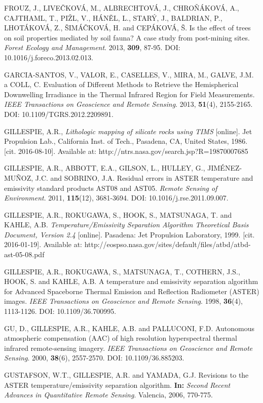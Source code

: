 \begin{thebibliography}{10}
 FROUZ, J., LIVEČKOVÁ, M., ALBRECHTOVÁ, J., CHROŇÁKOVÁ, A., CAJTHAML, T., PIŽL, V., HÁNĚL, L., STARÝ, J., BALDRIAN, P., LHOTÁKOVÁ, Z., ŠIMÁČKOVÁ, H. and CEPÁKOVÁ, Š. Is the effect of trees on soil properties mediated by soil fauna? A case study from post-mining sites. \textit{Forest Ecology and Management}. 2013, \textbf{309}, 87-95. DOI: 10.1016/j.foreco.2013.02.013.

 GARCIA-SANTOS, V., VALOR, E., CASELLES, V., MIRA, M., GALVE, J.M. a COLL, C. Evaluation of Different Methods to Retrieve the Hemispherical Downwelling Irradiance in the Thermal Infrared Region for Field Measurements. \textit{IEEE Transactions on Geoscience and Remote Sensing}. 2013, \textbf{51}(4), 2155-2165. DOI: 10.1109/TGRS.2012.2209891.

 GILLESPIE, A.R., \textit{Lithologic mapping of silicate rocks using TIMS} [online]. Jet Propulsion Lab., California Inst. of Tech., Pasadena, CA, United States, 1986. [cit. 2016-08-10]. Available at: http://ntrs.nasa.gov/search.jsp?R=19870007685

 GILLESPIE, A.R., ABBOTT, E.A., GILSON, L., HULLEY, G., JIMÉNEZ-MUÑOZ, J.C. and SOBRINO, J.A. Residual errors in ASTER temperature and emissivity standard products AST08 and AST05. \textit{Remote Sensing of Environment}. 2011, \textbf{115}(12), 3681-3694. DOI: 10.1016/j.rse.2011.09.007.

 GILLESPIE, A.R., ROKUGAWA, S., HOOK, S., MATSUNAGA, T. and KAHLE, A.B. \textit{Temperature/Emissivity Separation Algorithm Theoretical Basis Document, Version 2.4} [online]. Pasadena: Jet Propulsion Laboratory, 1999. [cit. 2016-01-19]. Available at: http://eospso.nasa.gov/sites/default/files/atbd/atbd-ast-05-08.pdf 

 GILLESPIE, A.R., ROKUGAWA, S., MATSUNAGA, T., COTHERN, J.S., HOOK, S. and KAHLE, A.B. A temperature and emissivity separation algorithm for Advanced Spaceborne Thermal Emission and Reflection Radiometer (ASTER) images. \textit{IEEE Transactions on Geoscience and Remote Sensing}. 1998, \textbf{36}(4), 1113-1126. DOI: 10.1109/36.700995.

 GU, D., GILLESPIE, A.R., KAHLE, A.B. and PALLUCONI, F.D. Autonomous atmospheric compensation (AAC) of high resolution hyperspectral thermal infrared remote-sensing imagery. \textit{IEEE Transactions on Geoscience and Remote Sensing}. 2000, \textbf{38}(6), 2557-2570. DOI: 10.1109/36.885203.

 GUSTAFSON, W.T., GILLESPIE, A.R. and YAMADA, G.J. Revisions to the ASTER temperature/emissivity separation algorithm. \textbf{In:} \textit{Second Recent Advances in Quantitative Remote Sensing}. Valencia, 2006, 770-775.


\end{thebibliography}

